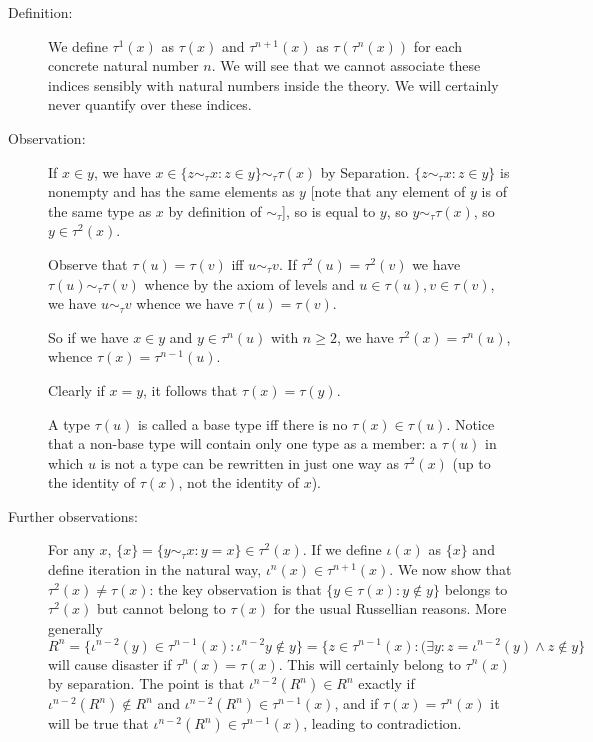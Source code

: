 \documentclass[12pt]{article}
\begin{document}
\begin{description}

\item[Definition:]  We define $\tau^1(x)$ as $\tau(x)$ and $\tau^{n+1}(x)$ as $\tau(\tau^n(x))$ for each concrete natural number $n$.  We will see that we cannot
associate these indices sensibly with natural numbers inside the theory.  We will certainly never quantify over these indices.

\item[Observation:]   If $x \in y$, we have $x \in \{z \sim_\tau x:z \in y\} \sim_\tau \tau(x)$ by Separation.  $\{z \sim_\tau x:z \in y\}$ is nonempty and has the same elements as
$y$ [note that any element of $y$ is of the same type as $x$ by definition of $\sim_\tau$], so is equal to $y$, so $y \sim_\tau \tau(x)$, so $y \in \tau^2(x)$.

Observe that $\tau(u) = \tau(v)$ iff  $u \sim_\tau v$.  If $\tau^2(u) = \tau^2(v)$ we have $\tau(u) \sim_\tau \tau(v)$  whence by the axiom of levels and $u \in \tau(u),v \in \tau(v)$,  we have $u \sim_\tau v$ whence we have $\tau(u)=\tau(v)$.

So if we have $x \in y$ and $y \in \tau^n(u)$ with $n \geq 2$, we have $\tau^2(x) = \tau^n(u)$, whence $\tau(x) = \tau^{n-1}(u)$.

Clearly if $x=y$, it follows that $\tau(x)=\tau(y)$.

A type $\tau(u)$ is called a base type iff there is no $\tau(x) \in \tau(u)$.  Notice that a non-base type will contain only one type as a member:  a $\tau(u)$ in which $u$ is
not a type can be rewritten in just one way as $\tau^2(x)$ (up to the identity of $\tau(x)$, not the identity of $x$).

\item[Further observations:]  For any $x$, $\{x\} = \{y \sim_\tau x:y=x\} \in \tau^2(x)$.  If we define $\iota(x)$ as $\{x\}$ and define iteration in the natural way,
$\iota^n(x) \in \tau^{n+1}(x)$.   We now show that $\tau^2(x) \neq \tau(x)$:  the key observation is that $\{y \in \tau(x):y \not\in y\}$ belongs to $\tau^2(x)$  but cannot belong to $\tau(x)$ for the usual Russellian reasons.    More generally $R^n = \{\iota^{n-2}(y) \in \tau^{n-1}(x):\iota^{n-2}y \not\in y\} = \{z \in \tau^{n-1}(x):(\exists y:z = \iota^{n-2}(y) \wedge z \not\in y\}$ will cause disaster if $\tau^n(x) = \tau(x)$.   This will certainly belong to
$\tau^n(x)$ by separation.  The point is that $\iota^{n-2}(R^n) \in R^n$ exactly if $\iota^{n-2}(R^n) \not\in R^n$ and $\iota^{n-2}(R^n) \in \tau^{n-1}(x)$, and if $\tau(x) = \tau^n(x)$
it will be true that $\iota^{n-2}(R^n) \in \tau^{n-1}(x)$, leading to contradiction.


\end{description}
\end{document}
